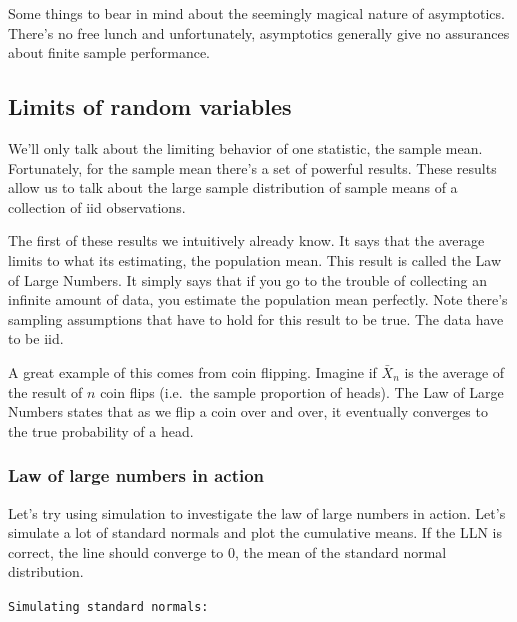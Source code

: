 \documentclass[]{article}
\begin{document}
Some things to bear in mind about the seemingly magical nature of
asymptotics. There's no free lunch and unfortunately, asymptotics
generally give no assurances about finite sample performance.

\subsection{Limits of random
variables}\label{limits-of-random-variables}

We'll only talk about the limiting behavior of one statistic, the sample
mean. Fortunately, for the sample mean there's a set of powerful
results. These results allow us to talk about the large sample
distribution of sample means of a collection of iid observations.

The first of these results we intuitively already know. It says that the
average limits to what its estimating, the population mean. This result
is called the Law of Large Numbers. It simply says that if you go to the
trouble of collecting an infinite amount of data, you estimate the
population mean perfectly. Note there's sampling assumptions that have
to hold for this result to be true. The data have to be iid.

A great example of this comes from coin flipping. Imagine if $\bar X_n$
is the average of the result of $n$ coin flips (i.e.~the sample
proportion of heads). The Law of Large Numbers states that as we flip a
coin over and over, it eventually converges to the true probability of a
head.

\subsubsection{Law of large numbers in
action}\label{law-of-large-numbers-in-action}

Let's try using simulation to investigate the law of large numbers in
action. Let's simulate a lot of standard normals and plot the cumulative
means. If the LLN is correct, the line should converge to 0, the mean of
the standard normal distribution.

\vspace{1pc}

\verb;Simulating standard normals:;
\end{document}
